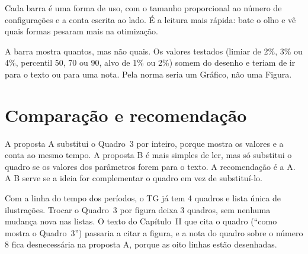 \documentclass[11pt,a4paper]{article}
\begin{document}
Cada barra é uma forma de uso, com o tamanho proporcional ao número de
configurações e a conta escrita ao lado. É a leitura mais rápida: bate o olho e
vê quais formas pesaram mais na otimização.

\begin{cuidado}
A barra mostra quantos, mas não quais. Os valores testados (limiar de 2\%, 3\% ou
4\%, percentil 50, 70 ou 90, alvo de 1\% ou 2\%) somem do desenho e teriam de ir
para o texto ou para uma nota. Pela norma seria um Gráfico, não uma Figura.
\end{cuidado}

\section{Comparação e recomendação}

A proposta A substitui o Quadro~3 por inteiro, porque mostra os valores e a conta
ao mesmo tempo. A proposta B é mais simples de ler, mas só substitui o quadro se
os valores dos parâmetros forem para o texto. A recomendação é a A. A B serve se a
ideia for complementar o quadro em vez de substituí-lo.

\begin{cuidado}
Com a linha do tempo dos períodos, o TG já tem 4 quadros e lista única de
ilustrações. Trocar o Quadro~3 por figura deixa 3 quadros, sem nenhuma mudança
nova nas listas. O texto do Capítulo~II que cita o quadro (``como mostra o
Quadro~3'') passaria a citar a figura, e a nota do quadro sobre o número 8 fica
desnecessária na proposta A, porque as oito linhas estão desenhadas.
\end{cuidado}
\end{document}
